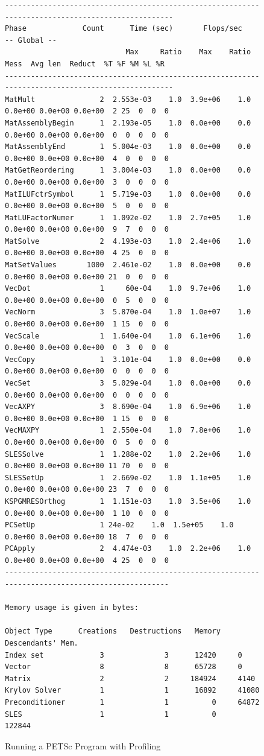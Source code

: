 \begin{figure}[H]
{\begin{verbatim}
--------------------------------------------------------------------------------------------------
Phase             Count      Time (sec)       Flops/sec                             -- Global --    
                            Max     Ratio    Max    Ratio   Mess  Avg len  Reduct  %T %F %M %L %R   
--------------------------------------------------------------------------------------------------
MatMult               2  2.553e-03    1.0  3.9e+06    1.0  0.0e+00 0.0e+00 0.0e+00  2 25  0  0  0
MatAssemblyBegin      1  2.193e-05    1.0  0.0e+00    0.0  0.0e+00 0.0e+00 0.0e+00  0  0  0  0  0
MatAssemblyEnd        1  5.004e-03    1.0  0.0e+00    0.0  0.0e+00 0.0e+00 0.0e+00  4  0  0  0  0
MatGetReordering      1  3.004e-03    1.0  0.0e+00    0.0  0.0e+00 0.0e+00 0.0e+00  3  0  0  0  0
MatILUFctrSymbol      1  5.719e-03    1.0  0.0e+00    0.0  0.0e+00 0.0e+00 0.0e+00  5  0  0  0  0
MatLUFactorNumer      1  1.092e-02    1.0  2.7e+05    1.0  0.0e+00 0.0e+00 0.0e+00  9  7  0  0  0
MatSolve              2  4.193e-03    1.0  2.4e+06    1.0  0.0e+00 0.0e+00 0.0e+00  4 25  0  0  0
MatSetValues       1000  2.461e-02    1.0  0.0e+00    0.0  0.0e+00 0.0e+00 0.0e+00 21  0  0  0  0
VecDot                1     60e-04    1.0  9.7e+06    1.0  0.0e+00 0.0e+00 0.0e+00  0  5  0  0  0
VecNorm               3  5.870e-04    1.0  1.0e+07    1.0  0.0e+00 0.0e+00 0.0e+00  1 15  0  0  0
VecScale              1  1.640e-04    1.0  6.1e+06    1.0  0.0e+00 0.0e+00 0.0e+00  0  3  0  0  0
VecCopy               1  3.101e-04    1.0  0.0e+00    0.0  0.0e+00 0.0e+00 0.0e+00  0  0  0  0  0
VecSet                3  5.029e-04    1.0  0.0e+00    0.0  0.0e+00 0.0e+00 0.0e+00  0  0  0  0  0
VecAXPY               3  8.690e-04    1.0  6.9e+06    1.0  0.0e+00 0.0e+00 0.0e+00  1 15  0  0  0
VecMAXPY              1  2.550e-04    1.0  7.8e+06    1.0  0.0e+00 0.0e+00 0.0e+00  0  5  0  0  0
SLESSolve             1  1.288e-02    1.0  2.2e+06    1.0  0.0e+00 0.0e+00 0.0e+00 11 70  0  0  0
SLESSetUp             1  2.669e-02    1.0  1.1e+05    1.0  0.0e+00 0.0e+00 0.0e+00 23  7  0  0  0
KSPGMRESOrthog        1  1.151e-03    1.0  3.5e+06    1.0  0.0e+00 0.0e+00 0.0e+00  1 10  0  0  0
PCSetUp               1 24e-02    1.0  1.5e+05    1.0  0.0e+00 0.0e+00 0.0e+00 18  7  0  0  0
PCApply               2  4.474e-03    1.0  2.2e+06    1.0  0.0e+00 0.0e+00 0.0e+00  4 25  0  0  0
-------------------------------------------------------------------------------------------------

Memory usage is given in bytes:

Object Type      Creations   Destructions   Memory  Descendants' Mem.
Index set             3              3      12420     0
Vector                8              8      65728     0
Matrix                2              2     184924     4140
Krylov Solver         1              1      16892     41080
Preconditioner        1              1          0     64872
SLES                  1              1          0     122844

\end{verbatim}
}
\nobreak
\caption{Running a PETSc Program with Profiling}
\label{fig_exprof}
\end{figure}

